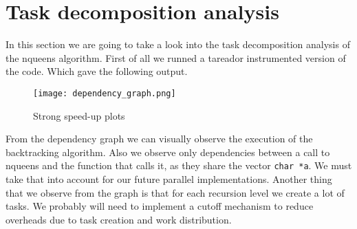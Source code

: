 \section{Task decomposition analysis}
\justify
In this section we are going to take a look into the task decomposition analysis of the nqueens algorithm.
\justify
First of all we runned a tareador instrumented version of the code. Which gave the following output.
\begin{figure}[!h]
    \centering
    \texttt{[image: dependency\_graph.png]}
    \caption{Strong speed-up plots}
    \label{fig:tareador}
\end{figure}
\justify
From the dependency graph we can visually observe the execution of the backtracking algorithm. Also we observe only dependencies between a call to nqueens and the function that calls it, as they share the vector \texttt{char *a}. We must take that into account for our future parallel implementations. 
\justify
Another thing that we observe from the graph is that for each recursion level we create a lot of tasks. We probably will need to implement a cutoff mechanism to reduce overheads due to task creation and work distribution.

